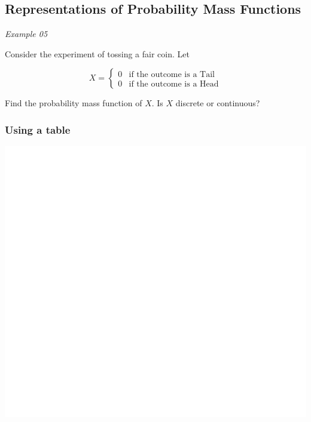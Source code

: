 \documentclass[]{book}
\begin{document}
\hypertarget{representations-of-probability-mass-functions}{%
\subsection{Representations of Probability Mass Functions}\label{representations-of-probability-mass-functions}}

\emph{Example 05}

Consider the experiment of tossing a fair coin. Let

\begin{equation}
X =
\begin{cases} 
0 & \text{if the outcome is a Tail }\\
0 & \text{if the outcome is a Head}
\end{cases}
\end{equation}

Find the probability mass function of \(X\). Is \(X\) discrete or continuous?

\hypertarget{using-a-table}{%
\subsubsection{Using a table}\label{using-a-table}}

\begin{center}\includegraphics[width=1\linewidth]{figure/Ch1box5-1} \end{center}
\end{document}
